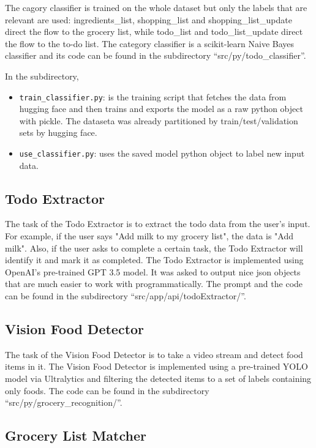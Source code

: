 \documentclass{article}
\begin{document}
The cagory classifier is trained on the whole dataset but only the labels that are relevant are used: ingredients\_list, shopping\_list and shopping\_list\_update direct the flow to the grocery list, while todo\_list and todo\_list\_update direct the flow to the to-do list. The category classifier is a scikit-learn Naive Bayes classifier and its code can be found in the subdirectory ``src/py/todo\_classifier''.


In the subdirectory,
\begin{itemize}
  \item \texttt{train\_classifier.py}: is the training script that fetches the data from hugging face and then trains and exports the model as a raw python object with pickle. The dataseta was already partitioned by train/test/validation sets by hugging face.
  \item \texttt{use\_classifier.py}: uses the saved model python object to label new input data.
\end{itemize}

\subsection*{\color{draculayellow}Todo Extractor}

The task of the Todo Extractor is to extract the todo data from the user's input. For example, if the user says "Add milk to my grocery list", the data is "Add milk". Also, if the user asks to complete a certain task, the Todo Extractor will identify it and mark it as completed. The Todo Extractor is implemented using OpenAI's pre-trained GPT 3.5 model. It was asked to output nice json objects that are much easier to work with programmatically. The prompt and the code can be found in the subdirectory ``src/app/api/todoExtractor/''.


\subsection*{\color{draculayellow}Vision Food Detector}

The task of the Vision Food Detector is to take a video stream and detect food items in it. The Vision Food Detector is implemented using a pre-trained YOLO model via Ultralytics and filtering the detected items to a set of labels containing only foods. The code can be found in the subdirectory ``src/py/grocery\_recognition/''.

\subsection*{\color{draculayellow}Grocery List Matcher}
\end{document}
